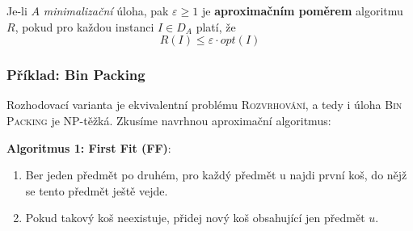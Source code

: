 \documentclass[11pt]{report} %
\numberwithin{equation}{section}
\begin{document}
Je-li $A$ \textit{minimalizační} úloha, pak $\varepsilon \geq 1$ je \textbf{aproximačním poměrem} algoritmu $R$, pokud pro každou instanci $I \in D_A$ platí, že 
$$R(I) \leq \varepsilon \cdot opt(I)$$

\subsubsection{Příklad: Bin Packing}
\begin{minipage}{\textwidth}
	\bigskip
	\centering
	\bigskip
\end{minipage}

Rozhodovací varianta je ekvivalentní problému \textsc{Rozvrhování}, a tedy i úloha \textsc{Bin Packing} je NP-těžká. Zkusíme navrhnou aproximační algoritmus:

\medskip
\noindent\textbf{Algoritmus 1: First Fit (FF)}: 
\begin{enumerate}
	
	
	\item Ber jeden předmět po druhém, pro každý předmět u najdi první koš, do nějž se tento předmět ještě vejde.
	\item Pokud takový koš neexistuje, přidej nový koš obsahující jen předmět $u$.  
\end{enumerate}
\end{document}

